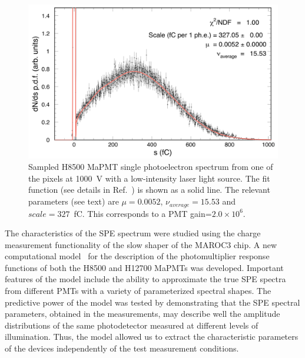 \documentclass[5p,times,twocolumn]{elsarticle}
\def\MaPMT{MaPMT }
\begin{document}
\begin{figure}[bth]
	\centering
	\includegraphics[width=\linewidth]{H8500-r-W0-CA7709-w3-g064-v1000-t227-37.png}
	\caption{Sampled H8500 \MaPMT single photoelectron spectrum from one of the pixels at 1000~V with a low-intensity
          laser light source. The fit function (see details in Ref.~\cite{Pavel}) is shown as a solid line. 
          The relevant parameters (see text) are $\mu=0.0052$, $\nu_{average}=15.53$ and $scale=327$~fC. This corresponds
          to a PMT gain=$2.0 \times 10^6$.
          }
	\label{fig:SPEH8500}
\end{figure}

The characteristics of the SPE spectrum were studied using the charge measurement functionality of the slow shaper
of the MAROC3 chip. A new computational model~\cite{Pavel} for the description of the photomultiplier response
functions of both the H8500 and H12700 MaPMTs was developed. Important features of the model include the ability
to approximate the true SPE spectra from different PMTs with a variety of
parameterized spectral shapes.
The predictive power of the model was tested by demonstrating that the SPE spectral parameters, obtained in the
measurements, may describe well the amplitude distributions of the same photodetector measured at different levels
of illumination. Thus, the model allowed us to extract the characteristic parameters of the devices independently of the test measurement conditions.
\end{document}
